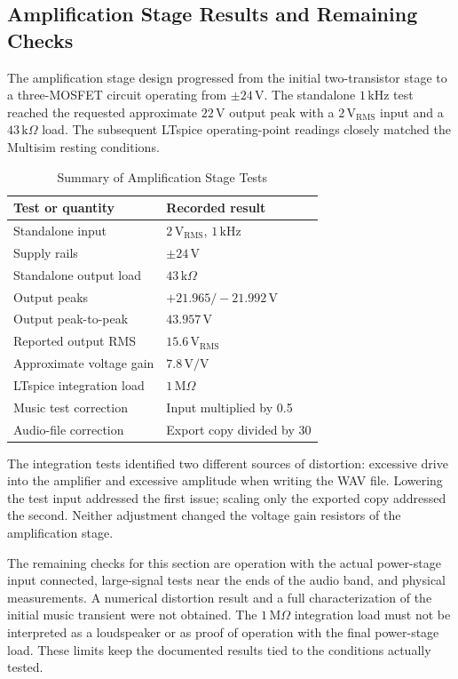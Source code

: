 \documentclass[conference]{IEEEtran}
\begin{document}
\subsection{Amplification Stage Results and Remaining Checks}
The amplification stage design progressed from the initial two-transistor stage to a three-MOSFET circuit operating from $\pm24\,\mathrm{V}$. The standalone $1\,\mathrm{kHz}$ test reached the requested approximate $22\,\mathrm{V}$ output peak with a $2\,\mathrm{V_{RMS}}$ input and a $43\,\mathrm{k}\Omega$ load. The subsequent LTspice operating-point readings closely matched the Multisim resting conditions.

\begin{table}[H]
\caption{Summary of Amplification Stage Tests}
\label{tab:amplification_summary}
\centering
\small
\begin{tabular}{p{}p{}}
\toprule
Test or quantity & Recorded result \\
\midrule
Standalone input & $2\,\mathrm{V_{RMS}}$, $1\,\mathrm{kHz}$ \\
Supply rails & $\pm24\,\mathrm{V}$ \\
Standalone output load & $43\,\mathrm{k}\Omega$ \\
Output peaks & $+21.965 / -21.992\,\mathrm{V}$ \\
Output peak-to-peak & $43.957\,\mathrm{V}$ \\
Reported output RMS & $15.6\,\mathrm{V_{RMS}}$ \\
Approximate voltage gain & $7.8\,\mathrm{V/V}$ \\
LTspice integration load & $1\,\mathrm{M}\Omega$ \\
Music test correction & Input multiplied by 0.5 \\
Audio-file correction & Export copy divided by 30 \\
\bottomrule
\end{tabular}
\end{table}

The integration tests identified two different sources of distortion: excessive drive into the amplifier and excessive amplitude when writing the WAV file. Lowering the test input addressed the first issue; scaling only the exported copy addressed the second. Neither adjustment changed the voltage gain resistors of the amplification stage.

The remaining checks for this section are operation with the actual power-stage input connected, large-signal tests near the ends of the audio band, and physical measurements. A numerical distortion result and a full characterization of the initial music transient were not obtained. The $1\,\mathrm{M}\Omega$ integration load must not be interpreted as a loudspeaker or as proof of operation with the final power-stage load. These limits keep the documented results tied to the conditions actually tested.
\end{document}
